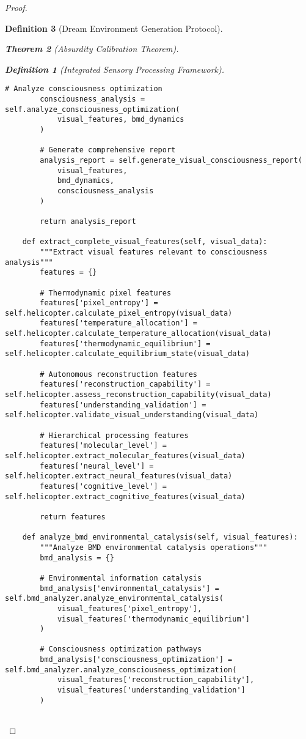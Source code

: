 \documentclass[12pt,a4paper]{article}
\newtheorem{theorem}{Theorem}[section]
\newtheorem{definition}[theorem]{Definition}
\begin{document}
\begin{proof}
\begin{definition}[Dream Environment Generation Protocol]
\begin{theorem}[Absurdity Calibration Theorem]
\begin{observation}
\begin{definition}[Integrated Sensory Processing Framework]
\begin{lstlisting}[style=pythonstyle, caption=Complete Visual Consciousness Analysis]
        # Analyze consciousness optimization
        consciousness_analysis = self.analyze_consciousness_optimization(
            visual_features, bmd_dynamics
        )
        
        # Generate comprehensive report
        analysis_report = self.generate_visual_consciousness_report(
            visual_features,
            bmd_dynamics,
            consciousness_analysis
        )
        
        return analysis_report
    
    def extract_complete_visual_features(self, visual_data):
        """Extract visual features relevant to consciousness analysis"""
        features = {}
        
        # Thermodynamic pixel features
        features['pixel_entropy'] = self.helicopter.calculate_pixel_entropy(visual_data)
        features['temperature_allocation'] = self.helicopter.calculate_temperature_allocation(visual_data)
        features['thermodynamic_equilibrium'] = self.helicopter.calculate_equilibrium_state(visual_data)
        
        # Autonomous reconstruction features
        features['reconstruction_capability'] = self.helicopter.assess_reconstruction_capability(visual_data)
        features['understanding_validation'] = self.helicopter.validate_visual_understanding(visual_data)
        
        # Hierarchical processing features
        features['molecular_level'] = self.helicopter.extract_molecular_features(visual_data)
        features['neural_level'] = self.helicopter.extract_neural_features(visual_data)
        features['cognitive_level'] = self.helicopter.extract_cognitive_features(visual_data)
        
        return features
    
    def analyze_bmd_environmental_catalysis(self, visual_features):
        """Analyze BMD environmental catalysis operations"""
        bmd_analysis = {}
        
        # Environmental information catalysis
        bmd_analysis['environmental_catalysis'] = self.bmd_analyzer.analyze_environmental_catalysis(
            visual_features['pixel_entropy'],
            visual_features['thermodynamic_equilibrium']
        )
        
        # Consciousness optimization pathways
        bmd_analysis['consciousness_optimization'] = self.bmd_analyzer.analyze_consciousness_optimization(
            visual_features['reconstruction_capability'],
            visual_features['understanding_validation']
        )
        

\end{lstlisting}
\end{definition}
\end{observation}
\end{theorem}
\end{definition}
\end{proof}
\end{document}
